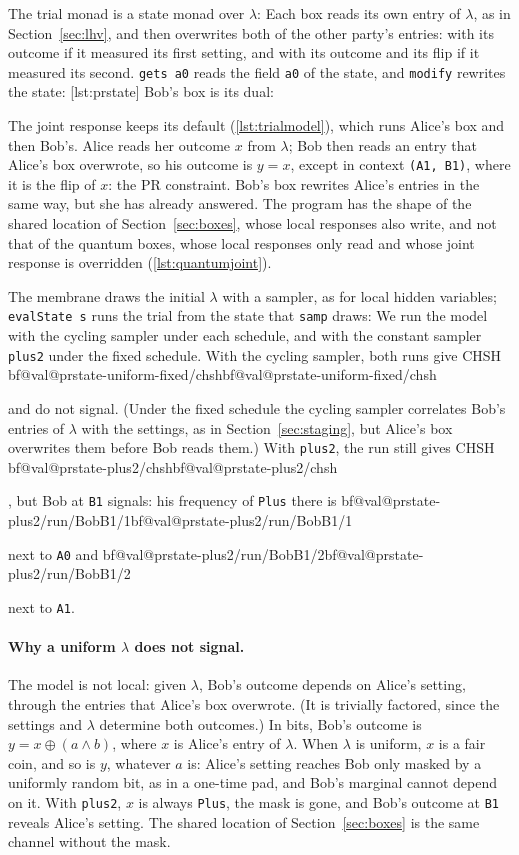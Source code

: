 \documentclass[11pt]{article}
\makeatletter
\newcommand{\hs}{\lstinline[style=hask,basicstyle=\ttfamily,frame=none]}
\newcommand{\val}[1]{\ifcsname bf@val@#1\endcsname\csname bf@val@#1\endcsname
  \else\PackageError{paper}{No value #1 in generated/values.tex}{}\fi}
\makeatother
\begin{document}
The trial monad is a state monad over $\lambda$:
Each box reads its own entry of $\lambda$, as in Section~\ref{sec:lhv}, and then overwrites both of the other party's entries: with its outcome if it measured its first setting, and with its outcome and its flip if it measured its second. \hs|gets a0| reads the field \hs|a0| of the state, and \hs|modify| rewrites the state:
[lst:prstate]
Bob's box is its dual:\par\nopagebreak
{}
The joint response keeps its default (\ref{lst:trialmodel}), which runs Alice's box and then Bob's. Alice reads her outcome $x$ from $\lambda$; Bob then reads an entry that Alice's box overwrote, so his outcome is $y = x$, except in context \hs|(A1, B1)|, where it is the flip of $x$: the PR constraint. Bob's box rewrites Alice's entries in the same way, but she has already answered. The program has the shape of the shared location of Section~\ref{sec:boxes}, whose local responses also write, and not that of the quantum boxes, whose local responses only read and whose joint response is overridden (\ref{lst:quantumjoint}).

The membrane draws the initial $\lambda$ with a sampler, as for local hidden variables; \hs|evalState s| runs the trial from the state that \hs|samp| draws:
We run the model with the cycling sampler under each schedule, and with the constant sampler \hs|plus2| under the fixed schedule. With the cycling sampler, both runs give CHSH \val{prstate-uniform-fixed/chsh} and do not signal. (Under the fixed schedule the cycling sampler correlates Bob's entries of $\lambda$ with the settings, as in Section~\ref{sec:staging}, but Alice's box overwrites them before Bob reads them.) With \hs|plus2|, the run still gives CHSH \val{prstate-plus2/chsh}, but Bob at \hs|B1| signals: his frequency of \hs|Plus| there is \val{prstate-plus2/run/BobB1/1} next to \hs|A0| and \val{prstate-plus2/run/BobB1/2} next to \hs|A1|.

\paragraph{Why a uniform $\lambda$ does not signal.} The model is not local: given $\lambda$, Bob's outcome depends on Alice's setting, through the entries that Alice's box overwrote. (It is trivially factored, since the settings and $\lambda$ determine both outcomes.) In bits, Bob's outcome is $y = x \oplus (a \land b)$, where $x$ is Alice's entry of $\lambda$. When $\lambda$ is uniform, $x$ is a fair coin, and so is $y$, whatever $a$ is: Alice's setting reaches Bob only masked by a uniformly random bit, as in a one-time pad, and Bob's marginal cannot depend on it. With \hs|plus2|, $x$ is always \hs|Plus|, the mask is gone, and Bob's outcome at \hs|B1| reveals Alice's setting. The shared location of Section~\ref{sec:boxes} is the same channel without the mask.
\end{document}
